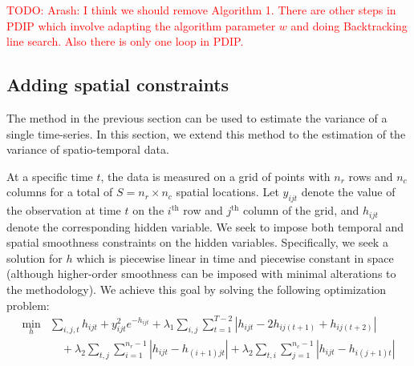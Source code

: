 \documentclass{article}
\newcommand{\attn}[1]{\textcolor{red}{TODO: #1}}
\begin{document}
\attn{Arash: I think we should remove Algorithm 1. There are other steps in PDIP which involve adapting the algorithm parameter $w$ and doing Backtracking line search. Also there is only one loop in PDIP.}

\subsection{Adding spatial constraints}
\label{sec:exten}

The method in the previous section can be used to estimate the
variance of a single time-series. In this section, we extend this
method to the estimation of the variance of spatio-temporal data. 

At a specific time $t$, the data is measured on a grid of points with
$n_r$ rows and $n_c$ columns for a total of $S=n_r\times n_c$ spatial
locations. Let $y_{ijt}$ denote the value of the 
observation at time $t$ on the $i^\text{th}$ row and $j^\text{th}$
column of the grid, and $h_{ijt}$ denote the corresponding hidden
variable. We seek to impose both temporal and spatial smoothness
constraints on the hidden variables. Specifically, we seek a solution
for $h$ which is piecewise linear in time and piecewise constant in
space (although higher-order smoothness can be imposed with minimal
alterations to the methodology). We achieve this goal
by solving the following optimization problem: 
\begin{align}
\min_h &\sum_{i,j,t}h_{ijt}+y_{ijt}^2e^{-h_{ijt}}
+\lambda_1 \sum_{i,j} \sum_{t=1}^{T-2} \left|h_{ijt}-2h_{ij(t+1)}+h_{ij(t+2)}\right|\\
&\quad+\lambda_2 \sum_{t,j} \sum_{i=1}^{n_r-1} \left|h_{ijt}-h_{(i+1)jt}\right|
+\lambda_2 \sum_{t,i} \sum_{j=1}^{n_c-1} \left|h_{ijt}-h_{i(j+1)t}\right|
\label{eq:l1tf_var_st}
\end{align}
\end{document}
